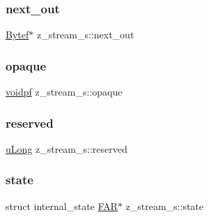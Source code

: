 \subsubsection{\texorpdfstring{next\+\_\+out}{next\_out}}
{\footnotesize\ttfamily \mbox{\hyperlink{ZlibCrc32_8h_aeb722a888064be47e12d05f692e0f407}{Bytef}}$\ast$ z\+\_\+stream\+\_\+s\+::next\+\_\+out}

\mbox{\label{structz__stream__s_ab72467f908d2ce65d5b42ee6556ef8bb}} 
\subsubsection{\texorpdfstring{opaque}{opaque}}
{\footnotesize\ttfamily \mbox{\hyperlink{ZlibCrc32_8h_a04c731495379021454c8e61439dc88ec}{voidpf}} z\+\_\+stream\+\_\+s\+::opaque}

\mbox{\label{structz__stream__s_add73791dd19b49c9c68f3f3d328c37db}} 
\subsubsection{\texorpdfstring{reserved}{reserved}}
{\footnotesize\ttfamily \mbox{\hyperlink{ZlibCrc32_8h_acd2a5701a3aecf6700d2c66c606ecb40}{u\+Long}} z\+\_\+stream\+\_\+s\+::reserved}

\mbox{\label{structz__stream__s_ac4a114217a1868dc6fbe7d1f5bda126b}} 
\subsubsection{\texorpdfstring{state}{state}}
{\footnotesize\ttfamily struct internal\+\_\+state \mbox{\hyperlink{ZlibCrc32_8h_aef060b3456fdcc093a7210a762d5f2ed}{F\+AR}}$\ast$ z\+\_\+stream\+\_\+s\+::state}

\mbox{\label{structz__stream__s_aa8f408b9632737dc21519fa1ed34b08d}} 
